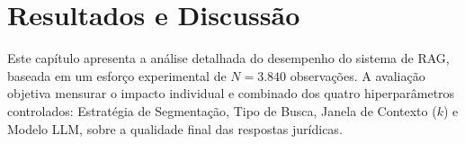\section{Resultados e Discussão}

Este capítulo apresenta a análise detalhada do desempenho do sistema de RAG, baseada em um esforço experimental de $N=3.840$ observações. A avaliação objetiva mensurar o impacto individual e combinado dos quatro hiperparâmetros controlados: Estratégia de Segmentação, Tipo de Busca, Janela de Contexto ($k$) e Modelo LLM, sobre a qualidade final das respostas jurídicas.